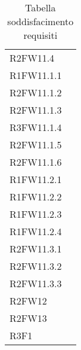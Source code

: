 \begin{table}[!htbp]
\begin{tabular}[t]{ m{}<{\centering}  m{}<{\centering} }
	R2FW11.4 & \Ns \\
	
	R1FW11.1.1 & \So \\
		
	R2FW11.1.2 & \So \\
		
	R2FW11.1.3 & \So \\
	
	R3FW11.1.4& \Ns \\
	
	R2FW11.1.5& \Ns \\
	
	R2FW11.1.6 & \So \\
	
	R1FW11.2.1 & \So \\

	R1FW11.2.2 & \So \\	
	
	R1FW11.2.3 & \So \\
	
	R1FW11.2.4 & \So \\
	
	R2FW11.3.1 & \So \\
	
	R2FW11.3.2 & \So \\
	
	R2FW11.3.3 & \So \\

	R2FW12& \Ns \\

	R2FW13 & \Ns \\

	R3F1 & \Ns \\


\end{tabular}
\caption{Tabella soddisfacimento requisiti}
\end{table}